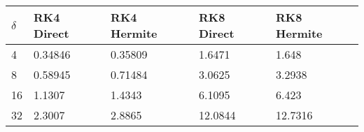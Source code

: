 \begin{tabular}{lllll}
$\delta$ & RK4 Direct & RK4 Hermite & RK8 Direct & RK8 Hermite\\ 
\hline 
4 & 0.34846 & 0.35809 & 1.6471 & 1.648 \\ 
8 & 0.58945 & 0.71484 & 3.0625 & 3.2938 \\ 
16 & 1.1307 & 1.4343 & 6.1095 & 6.423 \\ 
32 & 2.3007 & 2.8865 & 12.0844 & 12.7316 \\ 
\hline 
\end{tabular}
